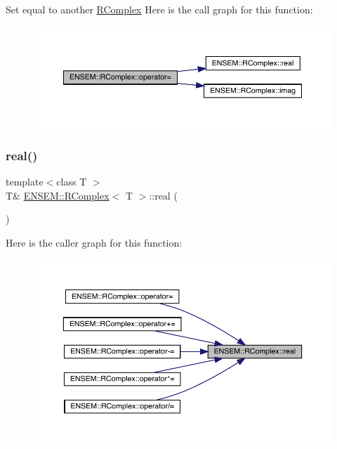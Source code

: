 Set equal to another \mbox{\hyperlink{classENSEM_1_1RComplex}{R\+Complex}} Here is the call graph for this function\+:
\nopagebreak
\begin{figure}[H]
\begin{center}
\leavevmode
\includegraphics[width=350pt]{d9/d0e/classENSEM_1_1RComplex_a14a5d3857ebb326ed5f211cc30da3ced_cgraph}
\end{center}
\end{figure}
\mbox{\label{classENSEM_1_1RComplex_a1675e3defa774edeb1a7390bd14a86c8}} 
\subsubsection{\texorpdfstring{real()}{real()}\hspace{0.1cm}{\footnotesize\ttfamily [1/4]}}
{\footnotesize\ttfamily template$<$class T $>$ \\
T\& \mbox{\hyperlink{classENSEM_1_1RComplex}{E\+N\+S\+E\+M\+::\+R\+Complex}}$<$ T $>$\+::real (\begin{DoxyParamCaption}{ }\end{DoxyParamCaption})\hspace{0.3cm}{\ttfamily [inline]}}

Here is the caller graph for this function\+:\nopagebreak
\begin{figure}[H]
\begin{center}
\leavevmode
\includegraphics[width=350pt]{d9/d0e/classENSEM_1_1RComplex_a1675e3defa774edeb1a7390bd14a86c8_icgraph}
\end{center}
\end{figure}
\mbox{\label{classENSEM_1_1RComplex_a1675e3defa774edeb1a7390bd14a86c8}} 
